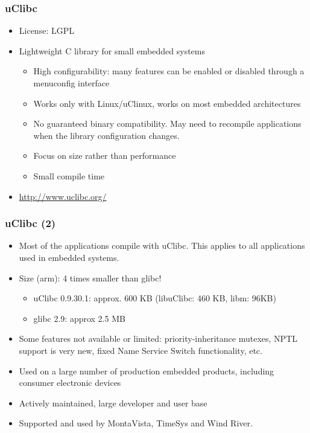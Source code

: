 \begin{frame}
  \frametitle{uClibc}
  \begin{itemize}
  \item License: LGPL
  \item Lightweight C library for small embedded systems
    \begin{itemize}
    \item High configurability: many features can be enabled or
      disabled through a menuconfig interface
    \item Works only with Linux/uClinux, works on most embedded
      architectures
    \item No guaranteed binary compatibility. May need to 
      recompile applications when the library configuration changes.
    \item Focus on size rather than performance
    \item Small compile time
    \end{itemize}
  \item \url{http://www.uclibc.org/}
  \end{itemize}
\end{frame}

\begin{frame}
  \frametitle{uClibc (2)}
  \begin{itemize}
  \item Most of the applications compile with uClibc. This applies to
    all applications used in embedded systems.
  \item Size (arm): 4 times smaller than glibc!
    \begin{itemize}
    \item uClibc 0.9.30.1: approx. 600 KB (libuClibc: 460 KB, libm:
      96KB)
    \item glibc 2.9: approx 2.5 MB
    \end{itemize}
  \item Some features not available or limited: priority-inheritance
    mutexes, NPTL support is very new, fixed Name Service Switch
    functionality, etc.
  \item Used on a large number of production embedded products,
    including consumer electronic devices
  \item Actively maintained, large developer and user base
  \item Supported and used by MontaVista, TimeSys and Wind River.
\end{itemize}
\end{frame}

